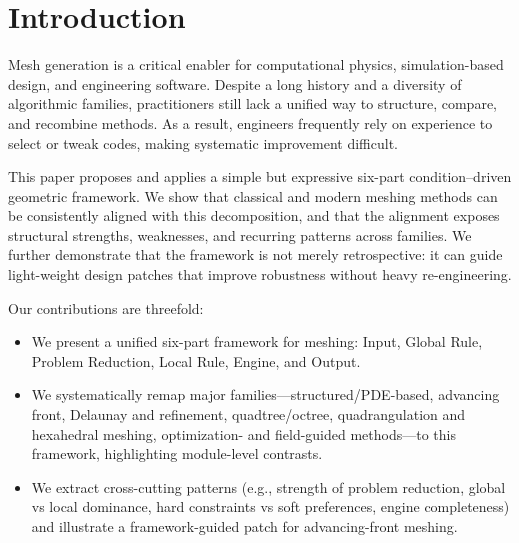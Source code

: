 \section{Introduction}
Mesh generation is a critical enabler for computational physics, simulation-based design, and engineering software. Despite a long history and a diversity of algorithmic families, practitioners still lack a unified way to structure, compare, and recombine methods. As a result, engineers frequently rely on experience to select or tweak codes, making systematic improvement difficult.

This paper proposes and applies a simple but expressive six-part condition--driven geometric framework. We show that classical and modern meshing methods can be consistently aligned with this decomposition, and that the alignment exposes structural strengths, weaknesses, and recurring patterns across families. We further demonstrate that the framework is not merely retrospective: it can guide light-weight design patches that improve robustness without heavy re-engineering.

Our contributions are threefold:
\begin{itemize}
  \item We present a unified six-part framework for meshing: Input, Global Rule, Problem Reduction, Local Rule, Engine, and Output.
  \item We systematically remap major families---structured/PDE-based, advancing front, Delaunay and refinement, quadtree/octree, quadrangulation and hexahedral meshing, optimization- and field-guided methods---to this framework, highlighting module-level contrasts.
  \item We extract cross-cutting patterns (e.g., strength of problem reduction, global vs local dominance, hard constraints vs soft preferences, engine completeness) and illustrate a framework-guided patch for advancing-front meshing.
\end{itemize}
